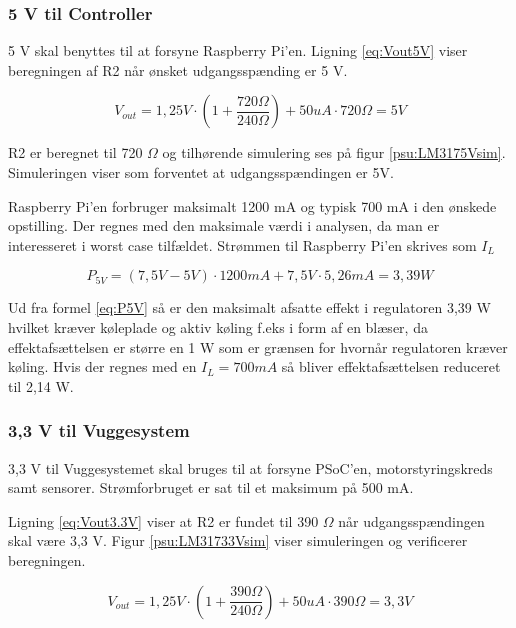 \subsubsection*{5 V til Controller}
5 V skal benyttes til at forsyne Raspberry Pi'en. Ligning \ref{eq:Vout5V} viser beregningen af R2 når ønsket udgangsspænding er 5 V.  

\begin{equation} 
{ V }_{ out }=1,25V\cdot \left( 1+\frac { 720\Omega  }{ 240\Omega  }  \right) +50uA\cdot 720\Omega =5V
\label{eq:Vout5V}
\end{equation}

R2 er beregnet til 720 $\Omega$ og tilhørende simulering ses på figur \ref{psu:LM3175Vsim}. Simuleringen viser som forventet at udgangsspændingen er 5V. 


Raspberry Pi'en forbruger maksimalt 1200 mA og typisk 700 mA i den ønskede opstilling. Der regnes med den maksimale værdi i analysen, da man er interesseret i worst case tilfældet. Strømmen til Raspberry Pi'en skrives som $I_{L}$

\begin{equation} 
{ P }_{ 5V }=(7,5V-5V)\cdot 1200mA+7,5V\cdot 5,26mA=3,39W
\label{eq:P5V}
\end{equation}

Ud fra formel \ref{eq:P5V} så er den maksimalt afsatte effekt i regulatoren 3,39 W hvilket kræver køleplade og aktiv køling f.eks i form af en blæser, da effektafsættelsen er større en 1 W som er grænsen for hvornår regulatoren kræver køling. Hvis der regnes med en $I_{L}=700 mA$ så bliver effektafsættelsen reduceret til 2,14 W.

\subsubsection*{3,3 V til Vuggesystem}
3,3 V til Vuggesystemet skal bruges til at forsyne PSoC'en, motorstyringskreds samt sensorer. Strømforbruget er sat til et maksimum på 500 mA.

Ligning \ref{eq:Vout3.3V} viser at R2 er fundet til 390 $\Omega$ når udgangsspændingen skal være 3,3 V. Figur \ref{psu:LM31733Vsim} viser simuleringen og verificerer beregningen. 

\begin{equation} 
{ V }_{ out }=1,25V\cdot \left( 1+\frac { 390\Omega  }{ 240\Omega  }  \right) +50uA\cdot 390\Omega =3,3V
\label{eq:Vout3.3V}
\end{equation}

